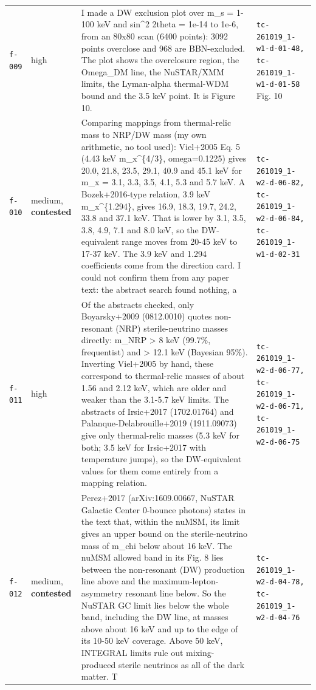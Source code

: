 \documentclass[11pt,a4paper]{article}
\begin{document}
\begin{longtable}{@{}p{}p{}p{}p{}@{}}
\texttt{f-009} & high & I made a DW exclusion plot over m\_s = 1-100 keV and sin\textasciicircum{}2 2theta = 1e-14 to 1e-6, from an 80x80 scan (6400 points): 3092 points overclose and 968 are BBN-excluded. The plot shows the overclosure region, the Omega\_DM line, the NuSTAR/XMM limits, the Lyman-alpha thermal-WDM bound and the 3.5 keV point. It is Figure 10. & \texttt{tc-261019\_\allowbreak{}1-w1-d-01-48,\allowbreak{} tc-261019\_\allowbreak{}1-w1-d-01-58} Fig. 10 \\
\texttt{f-010} & medium, \textbf{contested} & Comparing mappings from thermal-relic mass to NRP/DW mass (my own arithmetic, no tool used): Viel+2005 Eq. 5 (4.43 keV m\_x\textasciicircum{}\{4/3\}, omega=0.1225) gives 20.0, 21.8, 23.5, 29.1, 40.9 and 45.1 keV for m\_x = 3.1, 3.3, 3.5, 4.1, 5.3 and 5.7 keV. A Bozek+2016-type relation, 3.9 keV m\_x\textasciicircum{}\{1.294\}, gives 16.9, 18.3, 19.7, 24.2, 33.8 and 37.1 keV. That is lower by 3.1, 3.5, 3.8, 4.9, 7.1 and 8.0 keV, so the DW-equivalent range moves from 20-45 keV to 17-37 keV. The 3.9 keV and 1.294 coefficients come from the direction card. I could not confirm them from any paper text: the abstract search found nothing, a & \texttt{tc-261019\_\allowbreak{}1-w2-d-06-82,\allowbreak{} tc-261019\_\allowbreak{}1-w2-d-06-84,\allowbreak{} tc-261019\_\allowbreak{}1-w1-d-02-31} \\
\texttt{f-011} & high & Of the abstracts checked, only Boyarsky+2009 (0812.0010) quotes non-resonant (NRP) sterile-neutrino masses directly: m\_NRP \textgreater{} 8 keV (99.7\%, frequentist) and \textgreater{} 12.1 keV (Bayesian 95\%). Inverting Viel+2005 by hand, these correspond to thermal-relic masses of about 1.56 and 2.12 keV, which are older and weaker than the 3.1-5.7 keV limits. The abstracts of Irsic+2017 (1702.01764) and Palanque-Delabrouille+2019 (1911.09073) give only thermal-relic masses (5.3 keV for both; 3.5 keV for Irsic+2017 with temperature jumps), so the DW-equivalent values for them come entirely from a mapping relation. & \texttt{tc-261019\_\allowbreak{}1-w2-d-06-77,\allowbreak{} tc-261019\_\allowbreak{}1-w2-d-06-71,\allowbreak{} tc-261019\_\allowbreak{}1-w2-d-06-75} \\
\texttt{f-012} & medium, \textbf{contested} & Perez+2017 (arXiv:1609.00667, NuSTAR Galactic Center 0-bounce photons) states in the text that, within the nuMSM, its limit gives an upper bound on the sterile-neutrino mass of m\_chi below about 16 keV. The nuMSM allowed band in its Fig. 8 lies between the non-resonant (DW) production line above and the maximum-lepton-asymmetry resonant line below. So the NuSTAR GC limit lies below the whole band, including the DW line, at masses above about 16 keV and up to the edge of its 10-50 keV coverage. Above 50 keV, INTEGRAL limits rule out mixing-produced sterile neutrinos as all of the dark matter. T & \texttt{tc-261019\_\allowbreak{}1-w2-d-04-78,\allowbreak{} tc-261019\_\allowbreak{}1-w2-d-04-76} \\

\end{longtable}
\end{document}
